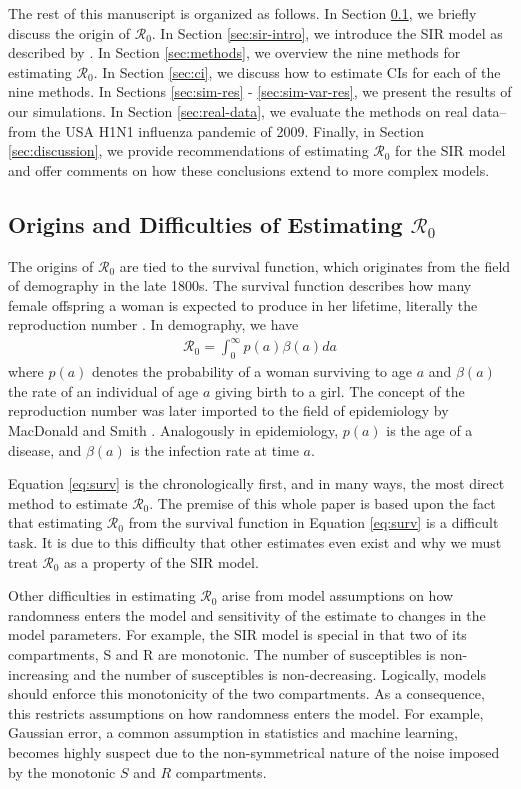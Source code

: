 \documentclass[12pt]{article}
\newcommand{\wxxsir}{nine } %
\newcommand{\rr}{\ensuremath{\mathcal{R}_0}}
\begin{document}
The rest of this manuscript is organized as follows.  In Section \ref{sec:r0}, we briefly discuss the origin of $\rr$.  In Section \ref{sec:sir-intro}, we introduce the SIR model as described by \cite{Kermack700}.  In Section \ref{sec:methods}, we overview the \wxxsir methods for estimating $\rr$. In Section \ref{sec:ci}, we discuss how to estimate CIs for each of the \wxxsir methods.  In Sections \ref{sec:sim-res} - \ref{sec:sim-var-res}, we present the results of our simulations.  In Section \ref{sec:real-data}, we evaluate the methods on real data--from the USA H1N1 influenza pandemic of 2009.  Finally, in Section \ref{sec:discussion}, we provide recommendations of estimating $\rr$ for the SIR model and offer comments on how these conclusions extend to more complex models.


\subsection{Origins and Difficulties of Estimating $\rr$}
\label{sec:r0}

The origins of $\rr$ are tied to the survival function, which originates from the field of demography in the late 1800s.  The survival function describes how many female offspring a woman is expected to produce in her lifetime, literally the reproduction number \citep{dietz1993estimation}.  In demography, we have
\begin{align}\label{eq:surv}
\rr = \int_0^\infty p(a) \beta(a) da
\end{align}
where $p(a)$ denotes the probability of a woman surviving to age $a$ and $\beta(a)$ the rate of an individual of age $a$ giving birth to a  girl.  The concept of the reproduction number was later imported to the field of epidemiology by MacDonald and Smith \citep{dietz1993estimation}.  Analogously in epidemiology, $p(a)$ is the age of a disease, and $\beta(a)$ is the infection rate at time $a$.

Equation \ref{eq:surv} is the chronologically first, and in many ways, the most direct method to estimate $\rr$.  The premise of this whole paper is based upon the fact that estimating $\rr$ from the survival function in Equation \eqref{eq:surv} is a difficult task.  It is due to this difficulty that other estimates even exist and why we must treat $\rr$ as a property of the SIR model.

Other difficulties in estimating $\rr$ arise from model assumptions on how randomness enters the model and sensitivity of the estimate to changes in the model parameters.  For example, the SIR model is special in that two of its compartments, S and R are monotonic.  The number of susceptibles is non-increasing and the number of susceptibles is non-decreasing.  Logically, models should enforce this monotonicity of the two compartments.  As a consequence, this restricts assumptions on how randomness enters the model.  For example, Gaussian error, a common assumption in statistics and machine learning, becomes highly suspect due to the non-symmetrical nature of the noise imposed by the monotonic $S$ and $R$ compartments. 
\end{document}
